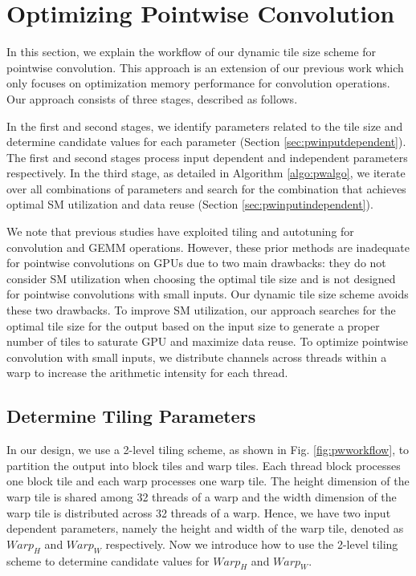 \section{Optimizing Pointwise Convolution}
\label{sec:pwconv} In this section, we explain the workflow of our dynamic tile size scheme for pointwise convolution. {\color{red}This approach is an extension of our previous work \cite{lu2020optimizing} which only focuses on optimization memory performance for convolution operations}. Our approach
consists of three stages, described as follows.

In the first and second stages, we identify parameters related to the tile size and determine candidate values for each parameter (Section
\ref{sec:pwinputdependent}). The first and second stages process input dependent and independent parameters respectively. In the third
stage, as detailed in Algorithm \ref{algo:pwalgo}, we iterate over all combinations of parameters and search for the combination that
achieves optimal SM utilization and data reuse (Section \ref{sec:pwinputindependent}).

We note that previous studies \cite{tanner2018tensile, kelefouras2016high, abdelfattah2019fast, kurzak2015implementation,
jiang2020enabling, tillet2017input, lan2019feathercnn,zhang2012autogeneration} have exploited tiling and autotuning for convolution and
GEMM operations. However, these prior methods are inadequate for pointwise convolutions on GPUs due to two main drawbacks: they do not
consider SM utilization when choosing the optimal tile size and is not designed for pointwise convolutions with small inputs. Our dynamic
tile size scheme avoids these two drawbacks. To improve SM utilization, our approach searches for the optimal tile size for the output
based on the input size to generate a proper number of tiles to saturate GPU and maximize data reuse. To optimize pointwise convolution
with small inputs, we distribute channels across threads within a warp to increase the arithmetic intensity for each thread.


\subsection{Determine Tiling Parameters\label{sec:pwinputdependent}}

In our design, we use a 2-level tiling scheme, as shown in Fig. \ref{fig:pwworkflow}, to partition the output into block tiles and warp tiles.
Each thread block processes one block tile and each warp processes one warp tile.
The height dimension of the warp tile is shared among 32 threads of a warp and the width dimension of the warp tile is distributed across 32 threads of a warp.
Hence, we have two input dependent parameters, namely the height and width of the warp tile, denoted as $Warp_H$ and $Warp_W$ respectively.
Now we introduce how to use the 2-level tiling scheme to determine candidate values for $Warp_H$ and $Warp_W$.
